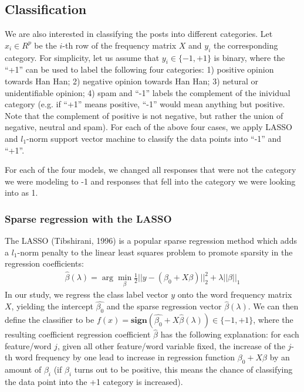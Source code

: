 \documentclass[11pt]{article}
\newcommand{\1}[1]{{\mathbf 1}\left\{#1\right\}}        %
\begin{document}
\subsection{Classification}
We are also interested in classifying the posts into different categories. Let $x_i\in R^{p}$ be the $i$-th row of the frequency matrix $X$ and $y_i$ the corresponding category. For simplicity, let us assume that $y_i\in\{-1,+1\}$ is binary, where the ``+1'' can be used to label the following four categories: 1) positive opinion towards Han Han; 2) negative opinion towards Han Han; 3) netural or unidentifiable opinion; 4) spam and ``-1'' labels the complement of the inividual category (e.g. if ``+1'' means positive, ``-1'' would mean anything but positive. Note that the complement of positive is not negative, but rather the union of negative, neutral and spam). For each of the above four cases, we apply LASSO and $l_1$-norm support vector machine to classify the data points into ``-1'' and ``+1''.  

For each of the four models, we changed all responses that were not the category we were modeling to -1 and responses that fell into the category we were looking into as 1.  
\subsubsection{Sparse regression with the LASSO}
The LASSO (Tibshirani, 1996) is a popular sparse regression method which adds a $l_1$-norm penalty to the linear least squares problem to promote sparsity in the regression coefficients:
\begin{align}
\label{eq:Lasso}
\hat{\beta}(\lambda) = \arg \min_\beta \frac{1}{2}||y-(\beta_0+X\beta)||_2^2 + \lambda ||\beta||_1
\end{align}
In our study, we regress the class label vector $y$ onto the word frequency matrix $X$, yielding the intercept $\hat{\beta_0}$ and the sparse regression vector $\hat{\beta}(\lambda)$. We can then define the classifier to be $f(x) = \textbf{sign}(\hat{\beta_0}+X\hat{\beta}(\lambda))\in\{-1,+1\}$, where the resulting coefficient regression coefficient $\hat{\beta}$ has the following explanation: for each feature/word $j$, given all other feature/word variable fixed, the increase of the $j$-th word frequency by one lead to increase in regression function $\beta_0+X\beta$ by an amount of $\beta_i$ (if $\beta_i$ turns out to be positive, this means the chance of classifying the data point into the +1 category is increased).
\end{document}
